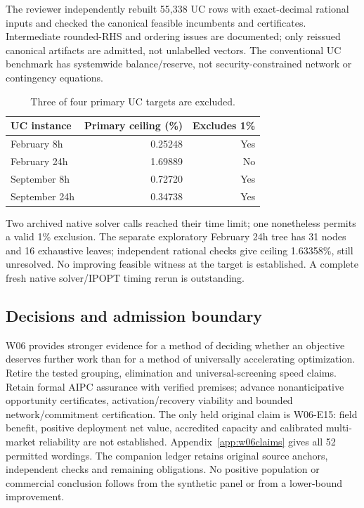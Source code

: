 \documentclass[11pt,letterpaper]{article}
\begin{document}
The reviewer independently rebuilt 55,338 UC rows with exact-decimal rational inputs and checked the canonical feasible incumbents and certificates. Intermediate rounded-RHS and ordering issues are documented; only reissued canonical artifacts are admitted, not unlabelled vectors. The conventional UC benchmark has systemwide balance/reserve, not security-constrained network or contingency equations.
\begin{table}[htbp]\centering\small
\begin{tabular}{lrr}\toprule
UC instance & Primary ceiling (\%) & Excludes 1\%\\\midrule
February 8h &0.25248&Yes\\
February 24h &1.69889&No\\
September 8h &0.72720&Yes\\
September 24h &0.34738&Yes\\\bottomrule
\end{tabular}
\caption{Three of four primary UC targets are excluded.}
\end{table}
Two archived native solver calls reached their time limit; one nonetheless permits a valid 1\% exclusion. The separate exploratory February 24h tree has 31 nodes and 16 exhaustive leaves; independent rational checks give ceiling 1.63358\%, still unresolved. No improving feasible witness at the target is established. A complete fresh native solver/IPOPT timing rerun is outstanding.

\subsection{Decisions and admission boundary}
W06 provides stronger evidence for a method of deciding whether an objective deserves further work than for a method of universally accelerating optimization. Retire the tested grouping, elimination and universal-screening speed claims. Retain formal AIPC assurance with verified premises; advance nonanticipative opportunity certificates, activation/recovery viability and bounded network/commitment certification. The only held original claim is W06-E15: field benefit, positive deployment net value, accredited capacity and calibrated multi-market reliability are not established. Appendix~\ref{app:w06claims} gives all 52 permitted wordings. The companion ledger retains original source anchors, independent checks and remaining obligations. No positive population or commercial conclusion follows from the synthetic panel or from a lower-bound improvement.
\end{document}

